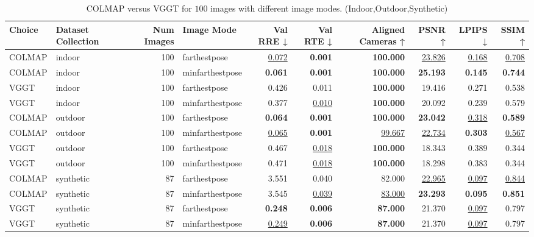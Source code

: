 \begin{table}[H]
\caption{\ifdefined\customcaption \customcaption \else COLMAP versus VGGT for $100$ images with different image modes. (Indoor,Outdoor,Synthetic) \fi}
\label{tab:01_image_mode_dense_indoor,outdoor,synthetic}
\centering
\scriptsize
\begin{tabular}{llrlrrrrrr}
\toprule
Choice & Dataset Collection & Num Images & Image Mode & Val RRE ↓ & Val RTE ↓ & Aligned Cameras ↑ & PSNR ↑ & LPIPS ↓ & SSIM ↑ \\
\midrule
COLMAP & indoor & 100 & farthestpose & \underline{0.072} & \textbf{0.001} & \textbf{100.000} & \underline{23.826} & \underline{0.168} & \underline{0.708} \\
COLMAP & indoor & 100 & minfarthestpose & \textbf{0.061} & \textbf{0.001} & \textbf{100.000} & \textbf{25.193} & \textbf{0.145} & \textbf{0.744} \\
VGGT & indoor & 100 & farthestpose & 0.426 & 0.011 & \textbf{100.000} & 19.416 & 0.271 & 0.538 \\
VGGT & indoor & 100 & minfarthestpose & 0.377 & \underline{0.010} & \textbf{100.000} & 20.092 & 0.239 & 0.579 \\
\midrule
COLMAP & outdoor & 100 & farthestpose & \textbf{0.064} & \textbf{0.001} & \textbf{100.000} & \textbf{23.042} & \underline{0.318} & \textbf{0.589} \\
COLMAP & outdoor & 100 & minfarthestpose & \underline{0.065} & \textbf{0.001} & \underline{99.667} & \underline{22.734} & \textbf{0.303} & \underline{0.567} \\
VGGT & outdoor & 100 & farthestpose & 0.467 & \underline{0.018} & \textbf{100.000} & 18.343 & 0.389 & 0.344 \\
VGGT & outdoor & 100 & minfarthestpose & 0.471 & \underline{0.018} & \textbf{100.000} & 18.298 & 0.383 & 0.344 \\
\midrule
COLMAP & synthetic & 87 & farthestpose & 3.551 & 0.040 & 82.000 & \underline{22.965} & \underline{0.097} & \underline{0.844} \\
COLMAP & synthetic & 87 & minfarthestpose & 3.545 & \underline{0.039} & \underline{83.000} & \textbf{23.293} & \textbf{0.095} & \textbf{0.851} \\
VGGT & synthetic & 87 & farthestpose & \textbf{0.248} & \textbf{0.006} & \textbf{87.000} & 21.370 & \underline{0.097} & 0.797 \\
VGGT & synthetic & 87 & minfarthestpose & \underline{0.249} & \textbf{0.006} & \textbf{87.000} & 21.370 & \underline{0.097} & 0.797 \\
\bottomrule
\end{tabular}
\end{table}